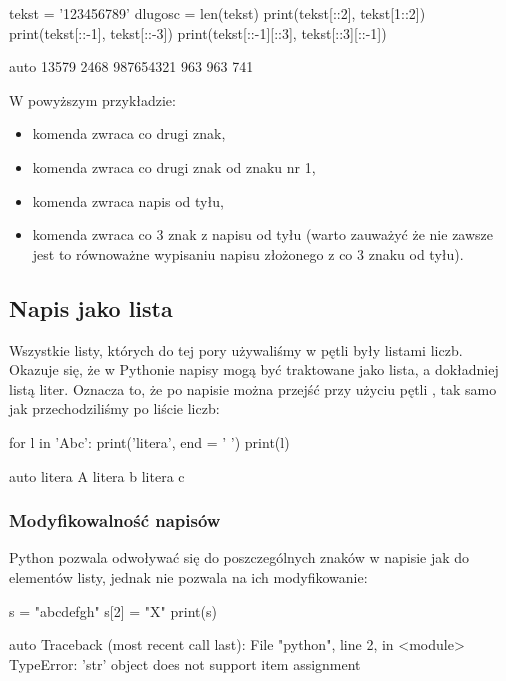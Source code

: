 \documentclass{pdfBooklets}
\begin{document}
\begin{CodeFrame}[python]{.7\textwidth}
tekst = '123456789'
dlugosc = len(tekst)
print(tekst[::2], tekst[1::2])
print(tekst[::-1], tekst[::-3])
print(tekst[::-1][::3], tekst[::3][::-1])
\end{CodeFrame}
\begin{CodeFrame}{auto}
13579 2468
987654321 963
963 741
\end{CodeFrame}

\pagebreak[2]\noindent
W powyższym przykładzie:
\begin{itemize}
\item komenda  zwraca co drugi znak,
\item komenda  zwraca co drugi znak od znaku nr 1,
\item komenda  zwraca napis od tyłu,
\item komenda  zwraca co 3 znak z napisu od tyłu (warto zauważyć że nie zawsze jest to równoważne wypisaniu napisu złożonego z co 3 znaku od tyłu).
\end{itemize}

\subsection{Napis jako lista}

Wszystkie listy, których do tej pory używaliśmy w pętli  były listami liczb.
Okazuje się, że w Pythonie napisy mogą być traktowane jako lista, a dokładniej listą liter. 
Oznacza to, że po napisie można przejść przy użyciu pętli , tak samo jak przechodziliśmy po liście liczb:

\begin{CodeFrame}[python]{0.50\textwidth}
for l in 'Abc':
    print('litera', end = ' ')
    print(l)
\end{CodeFrame}
\begin{CodeFrame}{auto}
litera A
litera b
litera c
\end{CodeFrame}

\subsubsection{Modyfikowalność napisów}

Python pozwala odwoływać się do poszczególnych znaków w napisie jak do elementów listy, jednak nie pozwala na ich modyfikowanie:

\begin{CodeFrame}[python]{0.25\textwidth}
s = "abcdefgh"
s[2] = "X"
print(s)
\end{CodeFrame}
\begin{CodeFrame}{auto}
Traceback (most recent call last):
  File "python", line 2, in <module>
TypeError: 'str' object does not support item assignment
\end{CodeFrame}
\end{document}
